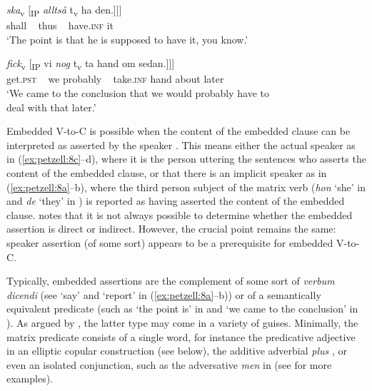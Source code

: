 \documentclass[output=paper,colorlinks,citecolor=brown,draft,draftmode]{langscibook}
\begin{document}
\gll     \textit{{ska}}\textsubscript{v}      [\textsubscript{IP} \textit{{alltså}}  t\textsubscript{v}    ha        den.]]]  \\
    shall     ~     thus   ~    have.\textsc{inf}    it\\
\glt `The point is that he is supposed to have it, you know.’  \\

\ex{\label{ex:petzell:8d}
\gll Vi    drog      slutsatsen [\textsubscript{CP}    att [\textsubscript{CP}     den\\
    we    draw.\textsc{pst}  conclusion.\textsc{def} ~ that    ~   it   \\}

\gll     \textit{{fick}}\textsubscript{v} [\textsubscript{IP}  vi    \textit{{nog}} t\textsubscript{v}     ta      hand  om    sedan.]]]  \\
    get.\textsc{pst} ~ we    probably ~ take.\textsc{inf}  hand   about    later\\
\glt `We came to the conclusion that we would probably have to   \\
    deal with that later.’
\z
\z


Embedded V-to-C is possible when the content of the embedded clause can be interpreted as asserted by the speaker \citep[21]{Andersson1975}. This means either the actual speaker as in (\ref{ex:petzell:8c}–d), where it is the person uttering the sentences who asserts the content of the embedded clause, or that there is an implicit speaker as in (\ref{ex:petzell:8a}–b), where the third person subject of the matrix verb (\textit{hon} ‘she’ in  and \textit{de} ‘they’ in ) is reported as having asserted the content of the embedded clause. \citet[164–167]{Julien2015} notes that it is not always possible to determine whether the embedded assertion is direct or indirect. However, the crucial point remains the same: speaker assertion (of some sort) appears to be a prerequisite for embedded V-to-C.



Typically, embedded assertions are the complement of some sort of \textit{verbum dicendi} (see ‘say’ and ‘report’ in (\ref{ex:petzell:8a}–b)) or of a semantically equivalent predicate (such as ‘the point is’ in  and ‘we came to the conclusion’ in ). As argued by \citet{Julien2009}, the latter type may come in a variety of guises. Minimally, the matrix predicate consists of a single word, for instance the predicative adjective in an elliptic copular construction (see  below), the additive adverbial \textit{plus} , or even an isolated conjunction, such as the adversative \textit{men} in  (see \citealt{Lyngfelt2003} for more examples).
\end{document}

